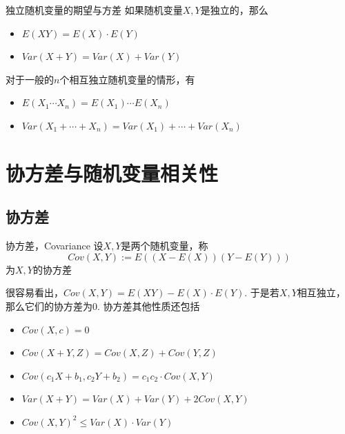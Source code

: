 
\begin{frame}

\begin{block}{独立随机变量的期望与方差}
如果随机变量$X,Y$是独立的，那么
\begin{itemize}
\item $E(XY) = E(X)\cdot E(Y)$
\item $Var(X+Y) = Var(X) + Var(Y)$
\end{itemize}

\vspace{2em}
\pause

对于一般的$n$个相互独立随机变量的情形，有
\begin{itemize}
\item $E(X_1\cdots X_n) = E(X_1)\cdots E(X_n)$
\item $Var(X_1 + \cdots + X_n) = Var(X_1) + \cdots + Var(X_n)$
\end{itemize}
\end{block}

\end{frame}


\section{协方差与随机变量相关性}


\subsection{协方差}


\begin{frame}

\begin{block}{协方差，Covariance}
设$X,Y$是两个随机变量，称
\[Cov(X,Y) := E((X-E(X))(Y-E(Y)))\]
为$X,Y$的协方差
\end{block}

\vspace{1em}
\pause

很容易看出，$Cov(X,Y) = E(XY) - E(X)\cdot E(Y)$. 于是若$X,Y$相互独立，那么它们的协方差为0. 协方差其他性质还包括
\begin{itemize}
\item $Cov(X,c) = 0$
\item $Cov(X+Y,Z) = Cov(X,Z) + Cov(Y,Z)$
\item $Cov(c_1X+b_1, c_2Y+b_2) = c_1c_2\cdot Cov(X,Y)$ \pause
\item $Var(X+Y) = Var(X) + Var(Y) + 2Cov(X,Y)$
\item $Cov(X,Y)^2 \le Var(X)\cdot Var(Y)$
\end{itemize}

\end{frame}

